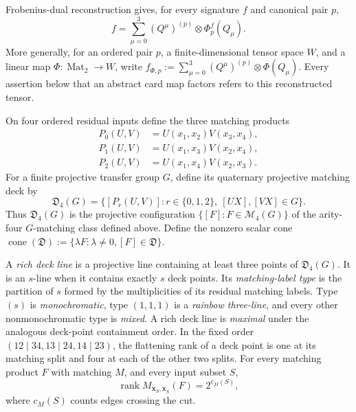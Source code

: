 \documentclass[11pt,letterpaper,onecolumn]{article}
\theoremstyle{plain}
\theoremstyle{definition}
\theoremstyle{remark}
\newcommand{\Mat}{\operatorname{Mat}}
\newcommand{\rank}{\operatorname{rank}}
\begin{document}
Frobenius-dual reconstruction gives, for every signature \(f\) and
canonical pair \(p\),
\begin{equation}
  f=\sum_{\mu=0}^3 (Q^\mu)^{(p)}\otimes\Phi_p^f(Q_\mu).
  \label{eq:platonic-frobenius-reconstruction}
\end{equation}
More generally, for an ordered pair \(p\), a finite-dimensional tensor
space \(W\), and a linear map \(\Phi:\Mat_2\to W\), write
\(f_{\Phi,p}:=\sum_{\mu=0}^3(Q^\mu)^{(p)}\otimes\Phi(Q_\mu)\).  Every assertion below
that an abstract card map factors refers to this reconstructed tensor.

On four ordered residual inputs define the three matching products
\begin{align*}
 P_0(U,V)&=U(x_1,x_2)V(x_3,x_4),\\
 P_1(U,V)&=U(x_1,x_3)V(x_2,x_4),\\
 P_2(U,V)&=U(x_1,x_4)V(x_2,x_3).
\end{align*}
For a finite projective transfer group \(G\), define its quaternary projective
matching deck by
\begin{equation*}
  \mathfrak D_4(G)=
  \{[P_r(U,V)]:r\in\{0,1,2\},\ [UX],[VX]\in G\}.
\end{equation*}
Thus \(\mathfrak D_4(G)\) is the projective configuration
\(\{[F]:F\in\mathcal M_4(G)\}\) of the arity-four
\(G\)-matching class defined above. Define the nonzero scalar cone
\(\operatorname{cone}(\mathfrak D):=\{\lambda F:\lambda\ne0,
[F]\in\mathfrak D\}\).

A \emph{rich deck line} is a projective line containing at least three
points of \(\mathfrak D_4(G)\).  It is an \(s\)-line when it contains
exactly \(s\) deck points.  Its \emph{matching-label type} is the partition
of \(s\) formed by the multiplicities of its residual matching labels.
Type \((s)\) is \emph{monochromatic}, type \((1,1,1)\) is a
\emph{rainbow three-line}, and every other nonmonochromatic type is
\emph{mixed}.  A rich deck line is \emph{maximal} under the analogous
deck-point containment order. In the fixed order
\((12\mid34,13\mid24,14\mid23)\), the flattening rank of a deck point is
one at its matching split and four at each of the other two splits.
For every matching product \(F\) with matching \(M\), and every input subset \(S\),
\begin{equation}
  \rank M_{\mathbf x_S,\mathbf x_{\bar S}}(F)=2^{c_M(S)},
  \label{eq:matching-schmidt-rank}
\end{equation}
where \(c_M(S)\) counts edges crossing the cut.
\end{document}
